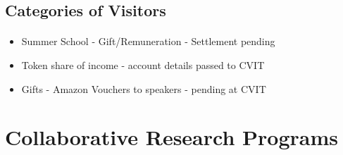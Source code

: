 \documentclass[aspectratio=169]{beamer}
\begin{document}
\subsection{Categories of Visitors}
\begin{frame}[fragile=singleslide]{\insertsectionhead}
  \framesubtitle{\insertsubsectionhead}
\begin{center}
\begin{itemize}
\item Summer School - Gift/Remuneration  - Settlement pending
\item \alert{Token share of income - account details passed to CVIT}
\item Gifts - Amazon Vouchers to speakers - pending at CVIT
\end{itemize}
\end{center}
\end{frame}







\section{Collaborative Research Programs}
\end{document}
